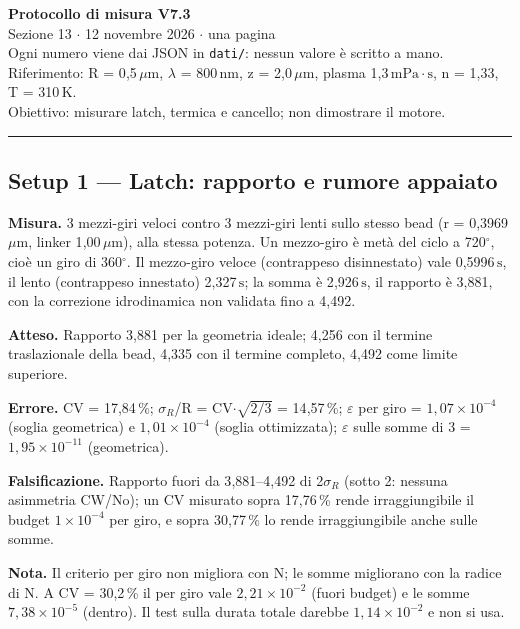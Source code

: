 \documentclass[9pt,a4paper]{article}
\begin{document}
\raggedright
\fontsize{9.5}{11.4}\selectfont
\begin{center}
{\Large\bfseries Protocollo di misura V7.3}\\[2pt]
{\small Sezione 13 $\cdot$ 12 novembre 2026 $\cdot$ una pagina}\\
{\small Ogni numero viene dai JSON in \texttt{dati/}: nessun valore è scritto a mano.}\\
{\small Riferimento: R = 0{,}5\,$\mu\mathrm{m}$, $\lambda$ = 800\,$\mathrm{nm}$, z = 2{,}0\,$\mu\mathrm{m}$, plasma 1{,}3\,$\mathrm{mPa}\cdot\mathrm{s}$, n = 1{,}33, T = 310\,$\mathrm{K}$.}\\
{\small Obiettivo: misurare latch, termica e cancello; non dimostrare il motore.}
\end{center}
\hrule\vspace{2pt}
\subsection*{Setup 1 --- Latch: rapporto e rumore appaiato}
\textbf{Misura.} 3 mezzi-giri veloci contro 3 mezzi-giri lenti sullo stesso bead (r = 0{,}3969\,$\mu\mathrm{m}$, linker 1{,}00\,$\mu\mathrm{m}$), alla stessa potenza. Un mezzo-giro è metà del ciclo a 720$^{\circ}$, cioè un giro di 360$^{\circ}$. Il mezzo-giro veloce (contrappeso disinnestato) vale 0{,}5996\,$\mathrm{s}$, il lento (contrappeso innestato) 2{,}327\,$\mathrm{s}$; la somma è 2{,}926\,$\mathrm{s}$, il rapporto è 3{,}881, con la correzione idrodinamica non validata fino a 4{,}492.

\textbf{Atteso.} Rapporto 3{,}881 per la geometria ideale; 4{,}256 con il termine traslazionale della bead, 4{,}335 con il termine completo, 4{,}492 come limite superiore.

\textbf{Errore.} CV = 17{,}84\,\%; $\sigma_R$/R = CV$\cdot$$\sqrt{2/3}$ = 14{,}57\,\%; $\varepsilon$ per giro = $1{,}07\times 10^{-4}$ (soglia geometrica) e $1{,}01\times 10^{-4}$ (soglia ottimizzata); $\varepsilon$ sulle somme di 3 = $1{,}95\times 10^{-11}$ (geometrica).

\textbf{Falsificazione.} Rapporto fuori da 3{,}881--4{,}492 di 2$\sigma_R$ (sotto 2: nessuna asimmetria CW/No); un CV misurato sopra 17{,}76\,\% rende irraggiungibile il budget $1\times 10^{-4}$ per giro, e sopra 30{,}77\,\% lo rende irraggiungibile anche sulle somme.

\textbf{Nota.} Il criterio per giro non migliora con N; le somme migliorano con la radice di N. A CV = 30{,}2\,\% il per giro vale $2{,}21\times 10^{-2}$ (fuori budget) e le somme $7{,}38\times 10^{-5}$ (dentro). Il test sulla durata totale darebbe $1{,}14\times 10^{-2}$ e non si usa.
\end{document}

